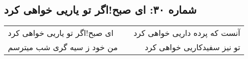 \begin{center}
\section*{شماره ۳۰: ای صبح!‌اگر تو یاریی خواهی کرد}
\label{sec:030}
\begin{longtable}{l p{0.5cm} r}
ای صبح!‌اگر تو یاریی خواهی کرد
&&
آنست که پرده داریی خواهی کرد
\\
من خود ز سیه گری شب میترسم
&&
تو نیز سفیدکاریی خواهی کرد
\\
\end{longtable}
\end{center}
